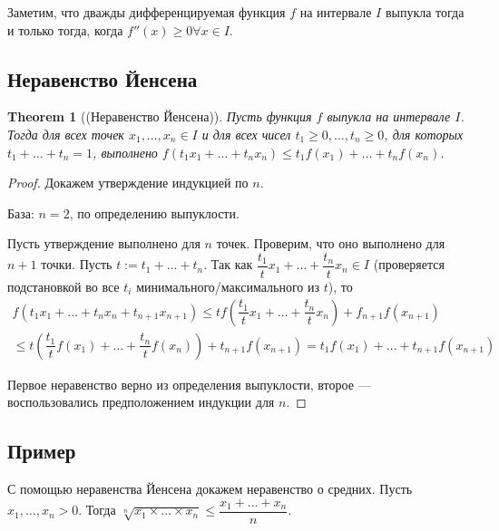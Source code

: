 \documentclass[a4paper]{article}
\theoremstyle{named}
\newtheorem*{namedtheorem}{Theorem}
\begin{document}
        Заметим, что дважды дифференцируемая функция $f$ на интервале $I$ выпукла тогда и только тогда, когда $f''(x) \geq 0 \forall x \in I$.

        \subsection{Неравенство Йенсена}

        \begin{namedtheorem}[(Неравенство Йенсена)]
            Пусть функция $f$ выпукла на интервале $I$. Тогда для всех точек $x_1, \dots, x_n \in I$ и для всех чисел $t_1 \geq 0, \dots, t_n \geq 0$, для которых $t_1 + \dots + t_n = 1$, выполнено $f(t_1x_1 + \dots + t_nx_n) \leq t_1f(x_1) + \dots + t_nf(x_n)$.
        \end{namedtheorem}

        \begin{proof}
            Докажем утверждение индукцией по $n$.

            База: $n = 2$, по определению выпуклости.

            Пусть утверждение выполнено для $n$ точек. Проверим, что оно выполнено для $n + 1$ точки. Пусть $t := t_1 + \dots + t_n$. Так как $\dfrac{t_1}{t}x_1 + \dots + \dfrac{t_n}{t}x_n \in I$ (проверяется подстановкой во все $t_i$ минимального/максимального из $t$), то
            \[\begin{gathered}
                f(t_1x_1 + \dots + t_nx_n + t_{n + 1}x_{n + 1}) \leq tf \left(\dfrac{t_1}{t}x_1 + \dots + \dfrac{t_n}{t}x_n\right) + f_{n + 1}f(x_{n + 1}) \\
                \leq t \left(\dfrac{t_1}{t}f(x_1) + \dots + \dfrac{t_n}{t}f(x_n)\right) + t_{n + 1}f(x_{n + 1}) = t_1f(x_1) + \dots + t_{n + 1}f(x_{n + 1})
            \end{gathered}\]

            Первое неравенство верно из определения выпуклости, второе --- воспользовались предположением индукции для $n$.
        \end{proof}

        \subsection{Пример}

        С помощью неравенства Йенсена докажем неравенство о средних. Пусть $x_1, \dots, x_n > 0$. Тогда $\sqrt[n]{x_1 \times \dots \times x_n} \leq \dfrac{x_1 + \dots + x_n}{n}$.
\end{document}
